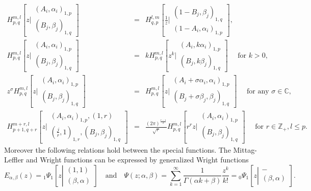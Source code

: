 \documentclass[10pt,a4paper]{amsart}
\begin{document}
\begin{eqnarray}
H^{m,l}_{p,q}\left[z\biggr\vert\begin{array}{c}
(A_i,\alpha_i)_{1,p}\\
(B_j,\beta_j)_{1,q}
\end{array}\right] & = & H^{l,m}_{q,p}\left[\frac{1}{z}\biggr\vert\begin{array}{c}
(1-B_j,\beta_j)_{1,q}\\
(1-A_i,\alpha_i)_{1,p}
\end{array}\right],\label{eq9}\\
H^{m,l}_{p,q}\left[z\biggr\vert\begin{array}{c}
(A_i,\alpha_i)_{1,p}\\
(B_j,\beta_j)_{1,q}
\end{array}\right] & = & k H^{m,l}_{p,q}\left[z^k\biggr\vert\begin{array}{c}
(A_i,k\alpha_i)_{1,p}\\
(B_j,k\beta_j)_{1,q}
\end{array}\right]\quad\mbox{ for } k>0,\label{eq10}\\
z^\sigma H^{m,l}_{p,q}\left[z\biggr\vert\begin{array}{c}
(A_i,\alpha_i)_{1,p}\\
(B_j,\beta_j)_{1,q}
\end{array}\right] & = & H^{m,l}_{p,q}\left[z\biggr\vert\begin{array}{c}
(A_i+\sigma\alpha_i,\alpha_i)_{1,p}\\
(B_j+\sigma\beta_j,\beta_j)_{1,q}
\end{array}\right]\quad\mbox{ for any } \sigma\in\mathbb{C},\label{eq11}\\
H^{m+r,l}_{p+1,q+r}\left[z\biggr\vert\begin{array}{c}
(A_i,\alpha_i)_{1,p},(1,r)\\
\left(\frac{j}{r},1\right)_{1,r},(B_j,\beta_j)_{1,q}
\end{array}\right] & = & \frac{(2\pi)^{\frac{r-1}{2}}}{\sqrt{r}}H^{m,l}_{p,q}\left[r^r z\biggr\vert\begin{array}{c}
(A_i,\alpha_i)_{1,p}\\
(B_j,\beta_j)_{1,q}
\end{array}\right]\quad\mbox{ for } r\in\mathbb{Z}_+, l\leq p .\label{eq12}
\end{eqnarray}
Moreover the following relations hold between the special functions. The Mittag-Leffler and Wright functions can be expressed by generalized Wright functions
\begin{equation}\label{eq13}
E_{\alpha,\beta}(z) = {}_1\Psi_1\left[z\left|\begin{array}{c}
(1,1)\\
(\beta,\alpha)
\end{array}\right.
\right] \quad\mbox{and}\quad
\Psi\left(z;\alpha,\beta\right) = \sum\limits_{k=1}^\infty \frac{1}{\Gamma(\alpha k+\beta)}\frac{z^k}{k!}={}_0\Psi_{1}\left[z\left|\begin{array}{c}
-\\
(\beta,\alpha)
\end{array}\right.\right].
\end{equation}
\end{document}
